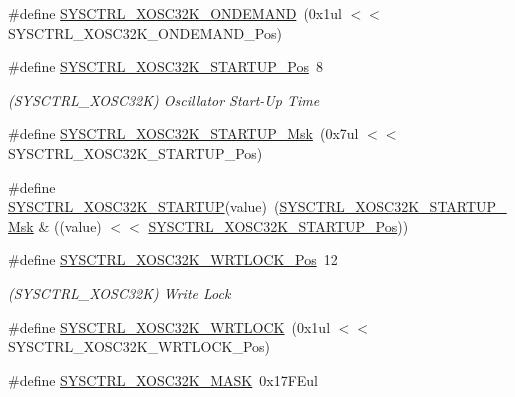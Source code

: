 \begin{DoxyCompactItemize}
\#define \mbox{\hyperlink{group___s_a_m_d21___s_y_s_c_t_r_l_ga25dbaf02a363c3a6eb8ca56c46d2b884}{S\+Y\+S\+C\+T\+R\+L\+\_\+\+X\+O\+S\+C32\+K\+\_\+\+O\+N\+D\+E\+M\+A\+ND}}~(0x1ul $<$$<$ S\+Y\+S\+C\+T\+R\+L\+\_\+\+X\+O\+S\+C32\+K\+\_\+\+O\+N\+D\+E\+M\+A\+N\+D\+\_\+\+Pos)
\item 
\#define \mbox{\hyperlink{group___s_a_m_d21___s_y_s_c_t_r_l_gaaf026c4a970c2977e635d98417bb8d29}{S\+Y\+S\+C\+T\+R\+L\+\_\+\+X\+O\+S\+C32\+K\+\_\+\+S\+T\+A\+R\+T\+U\+P\+\_\+\+Pos}}~8
\begin{DoxyCompactList}\small\item\em (S\+Y\+S\+C\+T\+R\+L\+\_\+\+X\+O\+S\+C32K) Oscillator Start-\/\+Up Time \end{DoxyCompactList}\item 
\#define \mbox{\hyperlink{group___s_a_m_d21___s_y_s_c_t_r_l_gad265703a8c2fcfe98521851c5816efb3}{S\+Y\+S\+C\+T\+R\+L\+\_\+\+X\+O\+S\+C32\+K\+\_\+\+S\+T\+A\+R\+T\+U\+P\+\_\+\+Msk}}~(0x7ul $<$$<$ S\+Y\+S\+C\+T\+R\+L\+\_\+\+X\+O\+S\+C32\+K\+\_\+\+S\+T\+A\+R\+T\+U\+P\+\_\+\+Pos)
\item 
\#define \mbox{\hyperlink{group___s_a_m_d21___s_y_s_c_t_r_l_ga2edc51b7d57ebb6afb2ce8dac09e04d4}{S\+Y\+S\+C\+T\+R\+L\+\_\+\+X\+O\+S\+C32\+K\+\_\+\+S\+T\+A\+R\+T\+UP}}(value)~(\mbox{\hyperlink{group___s_a_m_d21___s_y_s_c_t_r_l_gad265703a8c2fcfe98521851c5816efb3}{S\+Y\+S\+C\+T\+R\+L\+\_\+\+X\+O\+S\+C32\+K\+\_\+\+S\+T\+A\+R\+T\+U\+P\+\_\+\+Msk}} \& ((value) $<$$<$ \mbox{\hyperlink{group___s_a_m_d21___s_y_s_c_t_r_l_gaaf026c4a970c2977e635d98417bb8d29}{S\+Y\+S\+C\+T\+R\+L\+\_\+\+X\+O\+S\+C32\+K\+\_\+\+S\+T\+A\+R\+T\+U\+P\+\_\+\+Pos}}))
\item 
\#define \mbox{\hyperlink{group___s_a_m_d21___s_y_s_c_t_r_l_gaf0de64289cee69b017a0adce1b7cf95b}{S\+Y\+S\+C\+T\+R\+L\+\_\+\+X\+O\+S\+C32\+K\+\_\+\+W\+R\+T\+L\+O\+C\+K\+\_\+\+Pos}}~12
\begin{DoxyCompactList}\small\item\em (S\+Y\+S\+C\+T\+R\+L\+\_\+\+X\+O\+S\+C32K) Write Lock \end{DoxyCompactList}\item 
\#define \mbox{\hyperlink{group___s_a_m_d21___s_y_s_c_t_r_l_gaa6baf125d9bd8ce810d25cd01e1b5ac6}{S\+Y\+S\+C\+T\+R\+L\+\_\+\+X\+O\+S\+C32\+K\+\_\+\+W\+R\+T\+L\+O\+CK}}~(0x1ul $<$$<$ S\+Y\+S\+C\+T\+R\+L\+\_\+\+X\+O\+S\+C32\+K\+\_\+\+W\+R\+T\+L\+O\+C\+K\+\_\+\+Pos)
\item 
\#define \mbox{\hyperlink{group___s_a_m_d21___s_y_s_c_t_r_l_gaa45bd9360d66e1c0bb28fc2b9d77950d}{S\+Y\+S\+C\+T\+R\+L\+\_\+\+X\+O\+S\+C32\+K\+\_\+\+M\+A\+SK}}~0x17\+F\+Eul

\end{DoxyCompactItemize}
